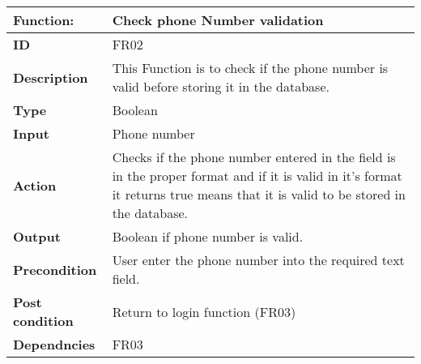 \documentclass[]{article}
\begin{document}
\FloatBarrier
\begin{table}[h]
\caption{ }
\label{tab:my-table}
\begin{tabular}{|p{}|p{}|}
\hline
\textbf{Function:} & Check phone Number validation
\\ \hline
\textbf{ID}  &            FR02

\\ \hline
\textbf{Description}    &     This Function is to check if the phone number is valid before storing it in the database.                                                                
\\ \hline
\textbf{Type}    &       Boolean  

\\ \hline
\textbf{Input}        & Phone number


\\ \hline
\textbf{Action}            & Checks if the phone number entered in the  field  is in the proper format and  if it is valid in it's format it returns true means that it is valid to be stored in the database.

\\ \hline
\textbf{Output}            & Boolean if phone number is valid.

\\ \hline
\textbf{Precondition}           &   User enter the phone number into the required text field.

\\ \hline
\textbf{Post condition}           & Return to login function (FR03)


\\ \hline
\textbf{Dependncies}           & FR03
\\ \hline
\end{tabular}
\end{table}
\end{document}
